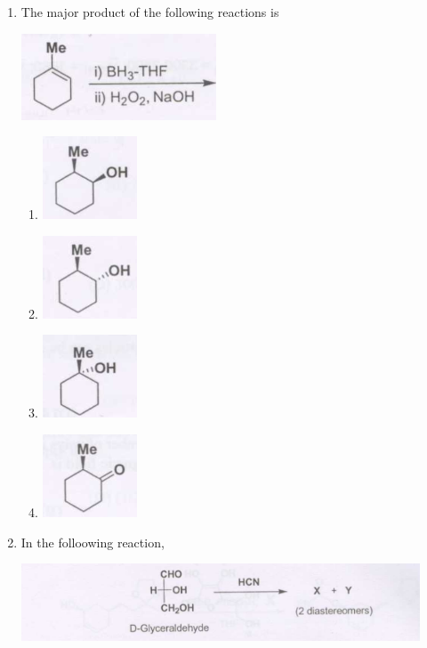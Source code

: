 \documentclass[12pt]{article}
\begin{document}
\begin{enumerate}
\item The major product of the following reactions is

\begin{center}
\includegraphics[width=0.6\columnwidth]{figs/q51.png}
\end{center}    \hfill{}
\begin{enumerate}
    \item \includegraphics[width=0.2\columnwidth]{figs/q51 a.png}
    \item \includegraphics[width=0.2\columnwidth]{figs/q51 b.png}
    \item \includegraphics[width=0.2\columnwidth]{figs/q51 c.png}
    \item \includegraphics[width=0.2\columnwidth]{figs/q51 d.png}
\end{enumerate}

\item In the folloowing reaction,

\begin{center}
\includegraphics[width=0.6\columnwidth]{figs/q52.png}
\end{center}


\end{enumerate}
\end{document}
